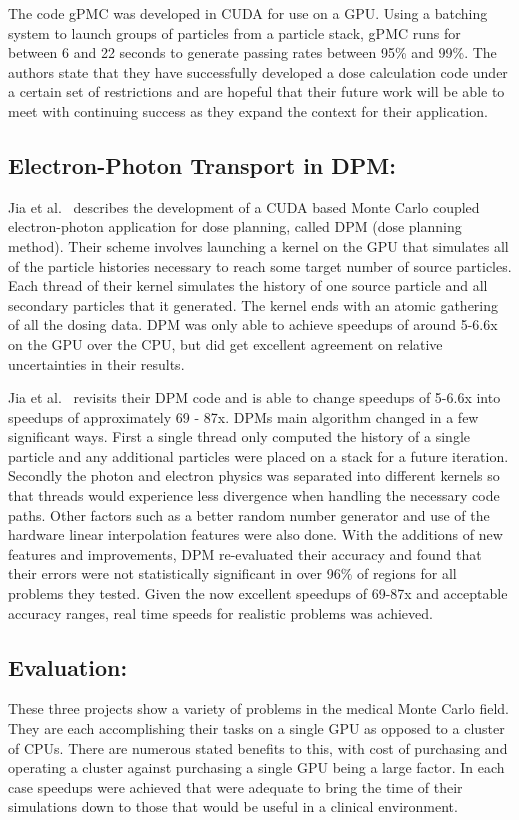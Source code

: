 %
The code gPMC was developed in CUDA for use on a GPU.
%
Using a batching system to launch groups of particles from a particle stack,
gPMC runs for between 6 and 22 seconds to generate passing rates between 95\% and 99\%.
%
The authors state that they have successfully developed a dose calculation code under a certain set of restrictions and are hopeful that their future work will be able to meet with continuing success as they expand the context for their application.~\cite{jia2012gpu}

\subsection*{\textbf{Electron-Photon Transport in DPM}:}

Jia et al.~\cite{jia2010development} describes the development of a CUDA based Monte Carlo coupled electron-photon application for dose planning, called DPM (dose planning method).
%
 Their scheme involves launching a kernel on the GPU that simulates all of the particle histories necessary to reach some target number of source particles.
 Each thread of their kernel simulates the history of one source particle and all secondary particles that it generated.
 The kernel ends with an atomic gathering of all the dosing data.
 DPM was only able to achieve speedups of around 5-6.6x on the GPU over the CPU, but did get excellent agreement on relative uncertainties in their results.~\cite{jia2010development}
 
 Jia et al.~\cite{jia2011gpu} revisits their DPM code and is able to change speedups of 5-6.6x into speedups of approximately 69 - 87x.
%
DPMs main algorithm changed in a few significant ways.
%
First a single thread only computed the history of a single particle and any additional particles were placed on a stack for a future iteration.
%
Secondly the photon and electron physics was separated into different kernels so that threads would experience less divergence when handling the necessary code paths.
%
Other factors such as a better random number generator and use of the hardware linear interpolation features were also done.
%
With the additions of new features and improvements, DPM re-evaluated their accuracy and found that their errors were not statistically significant in over 96\% of regions for all problems they tested.
%
Given the now excellent speedups of 69-87x and acceptable accuracy ranges, real time speeds for realistic problems was achieved.
~\cite{jia2011gpu}


\subsection*{\textbf{Evaluation}:}

These three projects show a variety of problems in the medical Monte Carlo field.
%
They are each accomplishing their tasks on a single GPU as opposed to a cluster of CPUs.
%
There are numerous stated benefits to this, with cost of purchasing and operating a cluster against purchasing a single GPU being a large factor.
%
In each case speedups were achieved that were adequate to bring the time of their simulations down to those that would be useful in a clinical environment.
%
